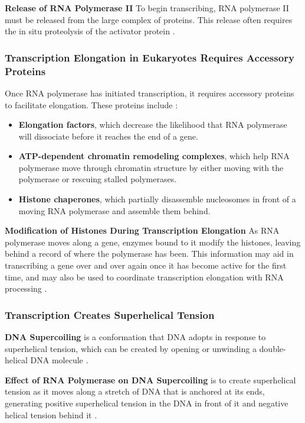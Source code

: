 \textbf{Release of RNA Polymerase II}
To begin transcribing, RNA polymerase II must be released from the large complex of proteins. This release often requires the in situ proteolysis of the activator protein \cite*{L1-Chapter6}.

\subsubsection*{Transcription Elongation in Eukaryotes Requires Accessory Proteins}
Once RNA polymerase has initiated transcription, it requires accessory proteins to facilitate elongation. These proteins include \cite*{L1-Chapter6}:

\begin{highlight}
    \begin{itemize}
        \item \textbf{Elongation factors}, which decrease the likelihood that RNA polymerase will dissociate before it reaches the end of a gene.
        \item \textbf{ATP-dependent chromatin remodeling complexes}, which help RNA polymerase move through chromatin structure by either moving with the polymerase or rescuing stalled polymerases.
        \item \textbf{Histone chaperones}, which partially disassemble nucleosomes in front of a moving RNA polymerase and assemble them behind.
    \end{itemize}
\end{highlight}

\textbf{Modification of Histones During Transcription Elongation}
As RNA polymerase moves along a gene, enzymes bound to it modify the histones, leaving behind a record of where the polymerase has been. This information may aid in transcribing a gene over and over again once it has become active for the first time, and may also be used to coordinate transcription elongation with RNA processing \cite*{L1-Chapter6}.

\subsubsection*{Transcription Creates Superhelical Tension}
\textbf{DNA Supercoiling} is a conformation that DNA adopts in response to superhelical tension, which can be created by opening or unwinding a double-helical DNA molecule \cite*{L1-Chapter6}.

\textbf{Effect of RNA Polymerase on DNA Supercoiling} is to create superhelical tension as it moves along a stretch of DNA that is anchored at its ends, generating positive superhelical tension in the DNA in front of it and negative helical tension behind it \cite*{L1-Chapter6}.

